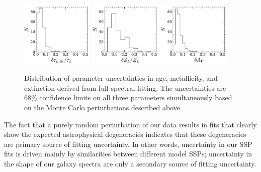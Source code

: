  
\begin{figure}
  \centering
  \includegraphics[width=0.31\textwidth]{891_2/figs/fit_uncertainty_MLWA.pdf}
  \includegraphics[width=0.31\textwidth]{891_2/figs/fit_uncertainty_MLWZ.pdf}
  \includegraphics[width=0.31\textwidth]{891_2/figs/fit_uncertainty_TAUV.pdf}
  \caption[Distributions of fit uncertainties in $\tau_L$, $Z_L$,
    $A_V$]{\fixspacing\label{891_2:fig:fit_err_hist}Distribution of
    parameter uncertainties in age, metallicity, and extinction
    derived from full spectral fitting.  The uncertainties are 68\%
    confidence limits on all three parameters simultaneously based on
    the Monte Carlo perturbations described above.}
\end{figure}

The fact that a purely random perturbation of our data results in fits
that clearly show the expected astrophysical degeneracies indicates
that these degeneracies are primary source of fitting uncertainty. In
other words, uncertainty in our SSP fits is driven mainly by
similarities between different model SSPs; uncertainty in the shape of
our galaxy spectra are only a secondary source of fitting uncertainty.


